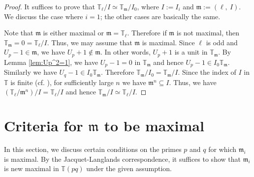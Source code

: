 \documentclass[a4paper, 12pt]{amsart}
\theoremstyle{definition}
\theoremstyle{remark}
\numberwithin{equation}{section} \numberwithin{table}{section}
\begin{document}
\begin{proof}
It suffices to prove that ${{\mathbb{T}}}_{\ell}/{I} \simeq {{\mathbb{T}}}_{{\mathfrak{m}}}/I_0$, where $I:=I_i$ and ${{\mathfrak{m}}}:=(\ell, ~I)$. 
We discuss the case where $i=1$; the other cases are basically the same. 

Note that ${{\mathfrak{m}}}$ is either maximal or ${{\mathfrak{m}}} = {{\mathbb{T}}}_{\ell}$.
Therefore if ${{\mathfrak{m}}}$ is not maximal, then ${{\mathbb{T}}}_{{\mathfrak{m}}}=0={{\mathbb{T}}}_{\ell}/I$. Thus, we may assume that ${{\mathfrak{m}}}$ is maximal. 
Since $\ell$ is odd and $U_p-1 \in {{\mathfrak{m}}}$, we have $U_p+1 \not\in {{\mathfrak{m}}}$. In other words, $U_p+1$ is a unit in ${{\mathbb{T}}}_{{\mathfrak{m}}}$. By Lemma \ref{lem:Up^2=1}, we have $U_p-1=0$ in ${{\mathbb{T}}}_{{\mathfrak{m}}}$ and hence $U_p-1 \in I_0 {{\mathbb{T}}}_{{\mathfrak{m}}}$. Similarly we have $U_q-1 \in I_0{{\mathbb{T}}}_{{\mathfrak{m}}}$. Therefore ${{\mathbb{T}}}_{{\mathfrak{m}}}/{I_0} = {{\mathbb{T}}}_{{\mathfrak{m}}}/I$. Since the index of $I$ in ${{\mathbb{T}}}$ is finite (cf. \cite[Lemma 3.1]{Yoo14}), for sufficiently large $n$ we have ${{\mathfrak{m}}}^n \subseteq I$. Thus, we have $({{\mathbb{T}}}_{\ell}/{{{\mathfrak{m}}}^n})/I = {{\mathbb{T}}}_{\ell}/I$ and hence ${{\mathbb{T}}}_{{\mathfrak{m}}}/I \simeq {{\mathbb{T}}}_{\ell}/I$.
\end{proof}

\section{Criteria for ${{\mathfrak{m}}}$ to be maximal}\label{sec:criteriaformaximality}
In this section, we discuss certain conditions on the primes $p$ and $q$ for which ${{\mathfrak{m}}}_i$ is maximal. By the Jacquet-Langlands correspondence, it suffices to show that ${{\mathfrak{m}}}_i$ is new maximal in ${{\mathbb{T}}}(pq)$ under the given assumption. 
\end{document}

